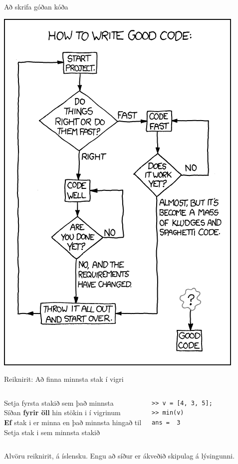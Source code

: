 \documentclass{beamer}
\begin{document}
\begin{frame}{Að skrifa góðan kóða}
\begin{center}
\includegraphics[height=0.85\textheight]{Pics/good-code} 
\end{center}
\end{frame}

\begin{frame}[fragile]{Reiknirit: Að finna minnsta stak í vigri}
\begin{columns}
Setja fyrsta stakið sem það minnsta\\
Síðan \textbf{fyrir öll} hin stökin i í vigrinum\\
\quad \textbf{Ef} stak i er minna en það minnsta hingað til\\
\qquad Setja stak i sem minnsta stakið
\begin{verbatim}
>> v = [4, 3, 5];
>> min(v)
ans =  3
\end{verbatim}
\end{columns}
\vspace{1cm}
Alvöru reiknirit, á íslensku. Engu að síður er ákveðið skipulag á lýsingunni.
\end{frame}
\end{document}
